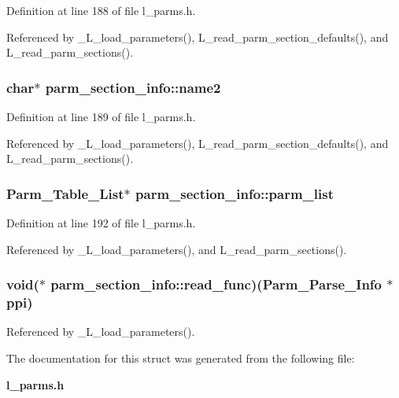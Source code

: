 Definition at line 188 of file l\_\-parms.h.

Referenced by \_\-L\_\-load\_\-parameters(), L\_\-read\_\-parm\_\-section\_\-defaults(), and L\_\-read\_\-parm\_\-sections().
\subsubsection{\setlength{\rightskip}{0pt plus 5cm}char$\ast$ \bf{parm\_\-section\_\-info::name2}}\label{structparm__section__info_1ebefcdb6e2d367be0618352f96bb5ab}




Definition at line 189 of file l\_\-parms.h.

Referenced by \_\-L\_\-load\_\-parameters(), L\_\-read\_\-parm\_\-section\_\-defaults(), and L\_\-read\_\-parm\_\-sections().
\subsubsection{\setlength{\rightskip}{0pt plus 5cm}\bf{Parm\_\-Table\_\-List}$\ast$ \bf{parm\_\-section\_\-info::parm\_\-list}}\label{structparm__section__info_a019a27e8f978548cf66a53f5bb453d9}




Definition at line 192 of file l\_\-parms.h.

Referenced by \_\-L\_\-load\_\-parameters(), and L\_\-read\_\-parm\_\-sections().
\subsubsection{\setlength{\rightskip}{0pt plus 5cm}void($\ast$ \bf{parm\_\-section\_\-info::read\_\-func})(\bf{Parm\_\-Parse\_\-Info} $\ast$ppi)}\label{structparm__section__info_9cc883c37209d8fc578883271ae1fec7}




Referenced by \_\-L\_\-load\_\-parameters().

The documentation for this struct was generated from the following file:\begin{CompactItemize}
\item 
\bf{l\_\-parms.h}\end{CompactItemize}
